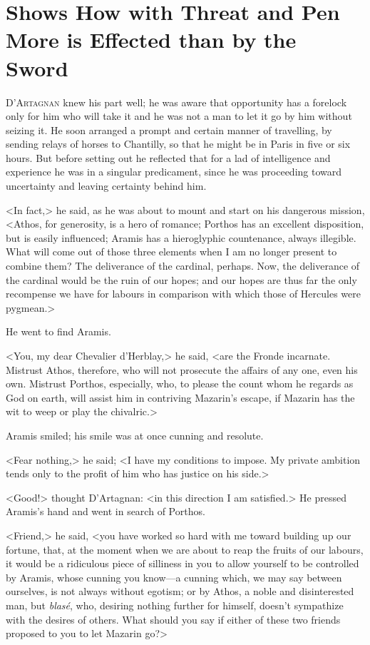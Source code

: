 \chapter[With Threat and Pen More is Effected than by the Sword]{Shows How with Threat and Pen More is Effected than by the Sword}
	


 \lettrine{D}{'Artagnan} knew his part well; he was aware that opportunity has a forelock only for him who will take it and he was not a man to let it go by him without seizing it. He soon arranged a prompt and certain manner of travelling, by sending relays of horses to Chantilly, so that he might be in Paris in five or six hours. But before setting out he reflected that for a lad of intelligence and experience he was in a singular predicament, since he was proceeding toward uncertainty and leaving certainty behind him.

<In fact,> he said, as he was about to mount and start on his dangerous mission, <Athos, for generosity, is a hero of romance; Porthos has an excellent disposition, but is easily influenced; Aramis has a hieroglyphic countenance, always illegible. What will come out of those three elements when I am no longer present to combine them? The deliverance of the cardinal, perhaps. Now, the deliverance of the cardinal would be the ruin of our hopes; and our hopes are thus far the only recompense we have for labours in comparison with which those of Hercules were pygmean.>

He went to find Aramis.

<You, my dear Chevalier d'Herblay,> he said, <are the Fronde incarnate. Mistrust Athos, therefore, who will not prosecute the affairs of any one, even his own. Mistrust Porthos, especially, who, to please the count whom he regards as God on earth, will assist him in contriving Mazarin's escape, if Mazarin has the wit to weep or play the chivalric.>

Aramis smiled; his smile was at once cunning and resolute.

<Fear nothing,> he said; <I have my conditions to impose. My private ambition tends only to the profit of him who has justice on his side.>

<Good!> thought D'Artagnan: <in this direction I am satisfied.> He pressed Aramis's hand and went in search of Porthos.

<Friend,> he said, <you have worked so hard with me toward building up our fortune, that, at the moment when we are about to reap the fruits of our labours, it would be a ridiculous piece of silliness in you to allow yourself to be controlled by Aramis, whose cunning you know—a cunning which, we may say between ourselves, is not always without egotism; or by Athos, a noble and disinterested man, but \textit{blasé}, who, desiring nothing further for himself, doesn't sympathize with the desires of others. What should you say if either of these two friends proposed to you to let Mazarin go?>

